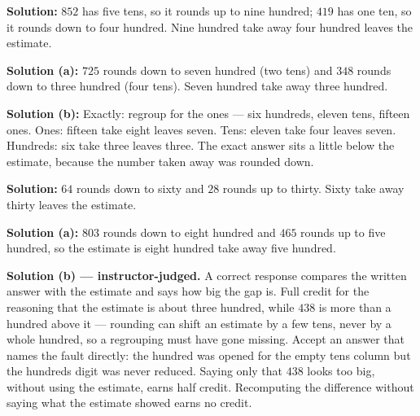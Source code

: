\documentclass[12pt]{article}
\begin{document}

\textbf{Solution:} $852$ has five tens, so it rounds up to nine hundred; $419$ has one ten, so it rounds down to four hundred. Nine hundred take away four hundred leaves the estimate. 


\textbf{Solution (a):} $725$ rounds down to seven hundred (two tens) and $348$ rounds down to three hundred (four tens). Seven hundred take away three hundred. 

\textbf{Solution (b):} Exactly: regroup for the ones --- six hundreds, eleven tens, fifteen ones. Ones: fifteen take eight leaves seven. Tens: eleven take four leaves seven. Hundreds: six take three leaves three. The exact answer sits a little below the estimate, because the number taken away was rounded down. 


\textbf{Solution:} $64$ rounds down to sixty and $28$ rounds up to thirty. Sixty take away thirty leaves the estimate. 


\textbf{Solution (a):} $803$ rounds down to eight hundred and $465$ rounds up to five hundred, so the estimate is eight hundred take away five hundred. 

\textbf{Solution (b) --- instructor-judged.} A correct response compares the written answer with the estimate and says how big the gap is. Full credit for the reasoning that the estimate is about three hundred, while $438$ is more than a hundred above it --- rounding can shift an estimate by a few tens, never by a whole hundred, so a regrouping must have gone missing. Accept an answer that names the fault directly: the hundred was opened for the empty tens column but the hundreds digit was never reduced. Saying only that $438$ looks too big, without using the estimate, earns half credit. Recomputing the difference without saying what the estimate showed earns no credit.
\end{document}
